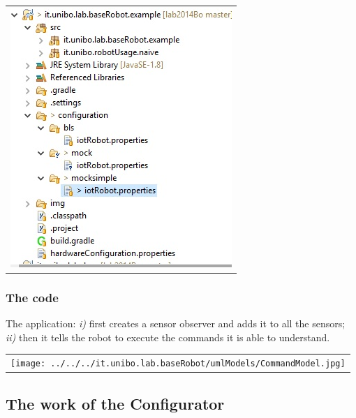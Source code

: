 \begin{center}
\begin{tabular}{ c }
     \includegraphics[scale = 0.7]{./img/baseRobotProject.jpg}\\
\end{tabular} 
\end{center}

\subsubsection{The code}

The application: \textit{i)} first creates a sensor observer and adds it to all the sensors; \textit{ii)} then it tells the robot to execute the commands it is able to understand.



\begin{center}
\begin{tabular}{ c }
     \texttt{[image: ../../../it.unibo.lab.baseRobot/umlModels/CommandModel.jpg]}\\
\end{tabular} 
\end{center}

\subsection{The work of the Configurator}

